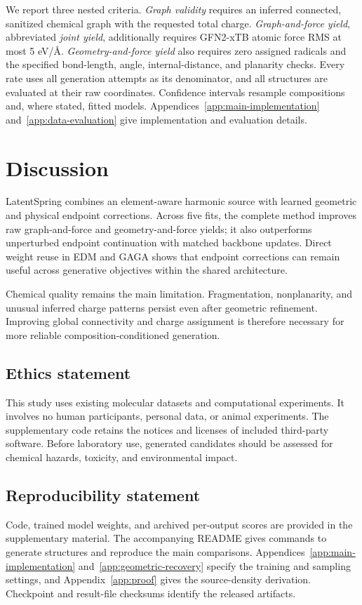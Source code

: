 \documentclass{article}
\begin{document}
We report three nested criteria. \emph{Graph validity} requires an inferred connected, sanitized chemical graph with the requested total charge. \emph{Graph-and-force yield}, abbreviated \emph{joint yield}, additionally requires GFN2-xTB atomic force RMS at most 5 eV/\AA. \emph{Geometry-and-force yield} also requires zero assigned radicals and the specified bond-length, angle, internal-distance, and planarity checks. Every rate uses all generation attempts as its denominator, and all structures are evaluated at their raw coordinates. Confidence intervals resample compositions and, where stated, fitted models. Appendices~\ref{app:main-implementation} and~\ref{app:data-evaluation} give implementation and evaluation details.




\section{Discussion}
LatentSpring combines an element-aware harmonic source with learned geometric and physical endpoint corrections. Across five fits, the complete method improves raw graph-and-force and geometry-and-force yields; it also outperforms unperturbed endpoint continuation with matched backbone updates. Direct weight reuse in EDM and GAGA shows that endpoint corrections can remain useful across generative objectives within the shared architecture.

Chemical quality remains the main limitation. Fragmentation, nonplanarity, and unusual inferred charge patterns persist even after geometric refinement. Improving global connectivity and charge assignment is therefore necessary for more reliable composition-conditioned generation.

\label{endofmaintext}
\subsection*{Ethics statement}
This study uses existing molecular datasets and computational experiments. It involves no human participants, personal data, or animal experiments. The supplementary code retains the notices and licenses of included third-party software. Before laboratory use, generated candidates should be assessed for chemical hazards, toxicity, and environmental impact.

\subsection*{Reproducibility statement}
Code, trained model weights, and archived per-output scores are provided in the supplementary material. The accompanying README gives commands to generate structures and reproduce the main comparisons. Appendices~\ref{app:main-implementation} and~\ref{app:geometric-recovery} specify the training and sampling settings, and Appendix~\ref{app:proof} gives the source-density derivation. Checkpoint and result-file checksums identify the released artifacts.
\end{document}
